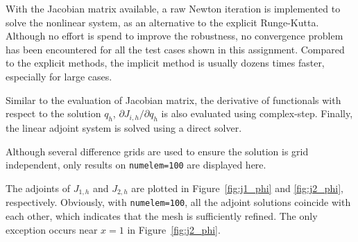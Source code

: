 \documentclass[a4paper]{article}
\begin{document}
With the Jacobian matrix available, a raw Newton iteration is implemented to solve the nonlinear system, as an alternative to the explicit Runge-Kutta. Although no effort is spend to improve the robustness, no convergence problem has been encountered for all the test cases shown in this assignment. Compared to the explicit methods, the implicit method is usually dozens times faster, especially for large cases.

Similar to the evaluation of Jacobian matrix, the derivative of functionals with respect to the solution $q_h$, $\partial J_{i,h}/\partial q_{h}$ is also evaluated using complex-step. Finally, the linear adjoint system is solved using a direct solver.

Although several difference grids are used to ensure the solution is grid independent, only results on \texttt{numelem=100} are displayed here. 

The adjoints of $J_{1,h}$ and $J_{2,h}$ are plotted in Figure~\ref{fig:j1_phi} and \ref{fig:j2_phi}, respectively. Obviously, with \texttt{numelem=100}, all the adjoint solutions coincide with each other, which indicates that the mesh is sufficiently refined. The only exception occurs near $x=1$ in Figure~\ref{fig:j2_phi}.
\end{document}
